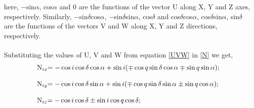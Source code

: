 here, $-$sin$\alpha$, cos$\alpha$ and 0 are the functions of the
vector U along X, Y and Z axes, respectively. Similarly,
$-$sin$\delta$cos$\alpha$, $-$sin$\delta$sin$\alpha$, cos$\delta$
and cos$\delta$cos$\alpha$, cos$\delta$sin$\alpha$, sin$\delta$
are the functions of the vectors V and W along X, Y and Z
directions, respectively.
\\
\\
Substituting the values of U, V and W from equation \eqref{UVW} in
\eqref{N} we get,
\begin{equation}\label{N_12}
\begin{array}{l}
$N$_{ix}$$ = - \cos i\cos \delta\cos \alpha + \sin i(\mp \cos q \sin \delta \cos \alpha \mp \sin q\sin \alpha); \\
\\
$N$_{iy}$$ = - \cos i\cos \delta\sin \alpha + \sin i(\mp \cos q \sin \delta \sin \alpha \pm \sin q\cos \alpha); \\
\\
$N$_{iz}$$ = - \cos i\cos \delta \pm \sin i\cos q\cos \delta ; \\
\end{array}
\end{equation}

